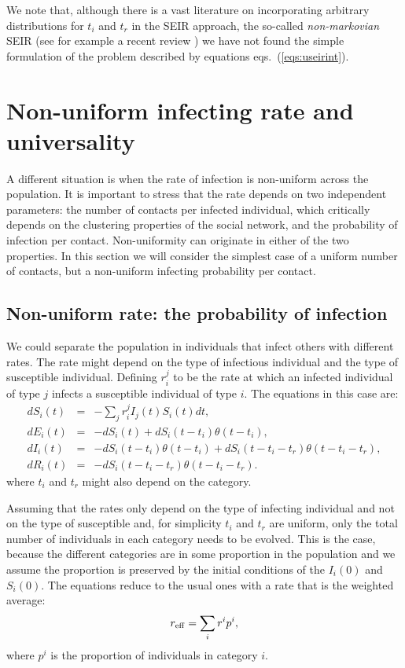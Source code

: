 \documentclass[a4paper,oneside,11pt]{article}
\begin{document}
We note that, although there is a vast literature on incorporating arbitrary distributions for $t_i$ and $t_r$ in the SEIR approach, the so-called 
{\it non-markovian} SEIR (see for example a recent review \cite{}) we have not found the simple formulation of the problem described by equations eqs.~(\ref{eqs:useirint}). 

\section{Non-uniform infecting rate and universality }
\label{sec:r}
A different situation is when the rate of infection is non-uniform across the population. It is important to stress that the rate depends on two independent parameters: the number of contacts per infected individual, which critically depends on the clustering properties of the social network,  and the probability of infection per contact. Non-uniformity can originate in either of the two properties. In this section we will consider the simplest case of a uniform number of contacts, but a non-uniform infecting probability per contact.

\subsection{Non-uniform rate: the probability of infection}
\label{sec:prob}

We could separate the population in individuals that infect others with different rates. The rate might depend on the type of infectious individual and the type of susceptible individual. Defining $r^{j}_{i}$ to be the rate at which an infected individual of type $j$ infects a susceptible individual of type $i$. The equations in this case are:
\begin{eqnarray}
d S_i(t) &=& - \sum_j r^j_{i}  I_j(t) S_i(t) dt, \nonumber\\
d E_i(t) &=& -d S_i(t) + d S_i(t-t_i) \theta(t-t_i) ,\nonumber\\
d I_i(t) &=& -d S_i(t-t_i) \theta(t-t_i)+ d S_i(t-t_i-t_r) \theta(t-t_i-t_r),\nonumber\\
d R_i(t) &=& - d S_i(t - t_i - t_r) \theta(t-t_i-t_r).\nonumber
\end{eqnarray}
where $t_i$ and $t_r$ might also depend on the category.

Assuming that the rates only depend on the type of infecting individual and not on the type of susceptible and, for simplicity $t_i$ and $t_r$ are uniform, only the total number of individuals in each category needs to be evolved. This is the case, because the different categories are in some proportion in the population and we assume the proportion is preserved by
 the initial conditions of the $I_i(0)$ and $S_i(0)$. The equations reduce to the usual ones with a rate that is the weighted average:
 \begin{eqnarray}
 r_{\rm eff} = \sum_i r^i p^i,
 \end{eqnarray}
 where $p^i$ is the proportion of individuals in category $i$.
\end{document}
